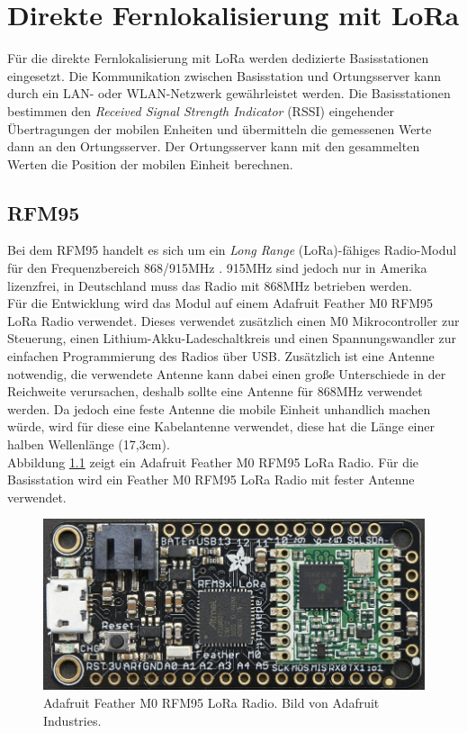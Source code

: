 \chapter{Direkte Fernlokalisierung mit LoRa}
\label{ch:phase4}
Für die direkte Fernlokalisierung mit LoRa werden dedizierte Basisstationen eingesetzt. 
Die Kommunikation zwischen Basisstation und Ortungsserver kann durch ein LAN- oder WLAN-Netzwerk gewährleistet werden.
Die Basisstationen bestimmen den \emph{Received Signal Strength Indicator} (RSSI) eingehender Übertragungen der mobilen Enheiten und übermitteln die gemessenen Werte dann an den Ortungsserver.
Der Ortungsserver kann mit den gesammelten Werten die Position der mobilen Einheit berechnen.

\section{RFM95}
\label{ch:hardwarechanges:sec:rfm95}
Bei dem RFM95 handelt es sich um ein \emph{Long Range} (LoRa)-fähiges Radio-Modul für den Frequenzbereich 868/915MHz \cite{hope2006rfm}. 
915MHz sind jedoch nur in Amerika lizenzfrei, in Deutschland muss das Radio mit 868MHz betrieben werden.\\
Für die Entwicklung wird das Modul auf einem Adafruit Feather M0 RFM95 LoRa Radio verwendet.
Dieses verwendet zusätzlich einen M0 Mikrocontroller zur Steuerung, einen Lithium-Akku-Ladeschaltkreis und einen Spannungswandler zur einfachen Programmierung des Radios über USB.
Zusätzlich ist eine Antenne notwendig, die verwendete Antenne kann dabei einen große Unterschiede in der Reichweite verursachen, deshalb sollte eine Antenne für 868MHz verwendet werden.
Da jedoch eine feste Antenne die mobile Einheit unhandlich machen würde, wird für diese eine Kabelantenne verwendet, diese hat die Länge einer halben Wellenlänge (17,3cm).\\
Abbildung \ref{fig:lorafeather} zeigt ein Adafruit Feather M0 RFM95 LoRa Radio. 
Für die Basisstation wird ein Feather M0 RFM95 LoRa Radio mit fester Antenne verwendet.

\begin{figure}[h]
  \centering
	\includegraphics[width=\textwidth]{images/loraada.png}
  \caption{Adafruit Feather M0 RFM95 LoRa Radio. Bild von Adafruit Industries.}
  \label{fig:lorafeather}
\end{figure}

